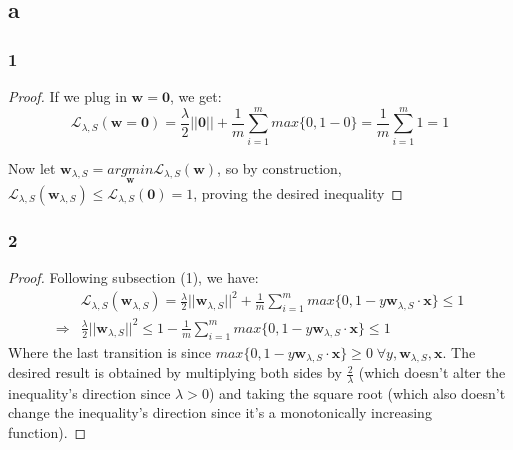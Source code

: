 \subsection*{a}
\subsubsection*{1}
\begin{proof}    
    If we plug in $\boldsymbol{w}=\boldsymbol{0}$, we get:
    \begin{equation*}
        \mathcal{L}_{\lambda, S}(\boldsymbol{w=0}) = \frac{\lambda}{2}||\boldsymbol{0}|| 
        + \frac{1}{m} \sum_{i=1}^{m} max\{0, 1-0\} = \frac{1}{m} \sum_{i=1}^{m} 1 = 1
    \end{equation*}
    
    Now let $\boldsymbol{w}_{\lambda, S} = \underset{\boldsymbol{w}}{argmin} \mathcal{L}_{\lambda, S}(\boldsymbol{w})$, so by construction, $\mathcal{L}_{\lambda, S}(\boldsymbol{w}_{\lambda, S}) \leq \mathcal{L}_{\lambda, S}(\boldsymbol{0}) = 1$, proving the desired inequality
\end{proof}

\subsubsection*{2}
\begin{proof}
    Following subsection (1), we have:
    \begin{equation*}
        \begin{split}            
            & \mathcal{L}_{\lambda, S}(\boldsymbol{w}_{\lambda, S}) = \frac{\lambda}{2}||\boldsymbol{w}_{\lambda, S}||^2 
            + \frac{1}{m} \sum_{i=1}^{m} max\{0, 1-y \boldsymbol{w}_{\lambda, S} \cdot \boldsymbol{x}\} \leq 1 \\
            \Rightarrow & \frac{\lambda}{2}||\boldsymbol{w}_{\lambda, S}||^2 \leq 1 - \frac{1}{m} \sum_{i=1}^{m} max\{0, 1-y \boldsymbol{w}_{\lambda, S} \cdot \boldsymbol{x}\} \leq 1
        \end{split}
    \end{equation*}
    Where the last transition is since $max\{0, 1-y \boldsymbol{w}_{\lambda, S} \cdot \boldsymbol{x}\} \geq 0 \; \forall y, \boldsymbol{w}_{\lambda, S}, \boldsymbol{x}$. The desired result is obtained by multiplying both sides by $\frac{2}{\lambda}$ (which doesn't alter the inequality's direction since $\lambda > 0$) and taking the square root (which also doesn't change the inequality's direction since it's a monotonically increasing function).
\end{proof}

